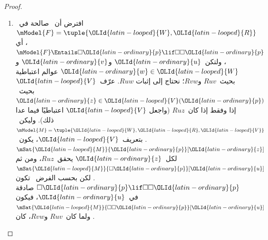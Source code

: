 \documentclass[../../../include/open-logic-section]{subfiles}
\begin{document}
\begin{proof}
\begin{enumerate}
    وُجد~$\OLId{latin-ordinary}{u}$ و$\OLId{latin-ordinary}{v} \in \OLId{latin-looped}{W}$ بحيث~$Ruv$ لكن ليس~$Rvu$. عرّف~$\OLId{latin-looped}{V}$ بحيث
    $\OLId{latin-ordinary}{w} \in \OLId{latin-looped}{V}(\OLId{latin-ordinary}{p})$ إذا وفقط إذا لم يكن~$Rvw$ (واجعل~$\OLId{latin-looped}{V}$ اعتباطيًا فيما
    عدا ذلك). وليكن~$\mModel{M} =\tuple{\OLId{latin-looped}{W}, \OLId{latin-looped}{R}, \OLId{latin-looped}{V}}$. الآن، بتعريف~$\OLId{latin-looped}{V}$،
    يكون~$\mSat{\OLId{latin-looped}{M}}{\OLId{latin-ordinary}{p}}[\OLId{latin-ordinary}{w}]$ لكل~$\OLId{latin-ordinary}{w}$ لا يحقق~$Rvw$، وبخاصة
    $\mSat{\OLId{latin-looped}{M}}{\OLId{latin-ordinary}{p}}[\OLId{latin-ordinary}{u}]$ لأن~$Rvu$ لا يصدق. كذلك، لما كان~$Rvw$ إذا وفقط
    إذا كان~$\OLId{latin-ordinary}{w} \notin \OLId{latin-looped}{V}(\OLId{latin-ordinary}{p})$، فلا يوجد~$\OLId{latin-ordinary}{w}$ يحقق~$Rvw$ و
    $\mSat{\OLId{latin-looped}{M}}{\OLId{latin-ordinary}{p}}[\OLId{latin-ordinary}{w}]$ معًا، ومن ثم~$\mSat/{\OLId{latin-looped}{M}}{\Diamond \OLId{latin-ordinary}{p}}[\OLId{latin-ordinary}{v}]$. ولما
    كان~$Ruv$، كان أيضًا~$\mSat/{\OLId{latin-looped}{M}}{\Box\Diamond \OLId{latin-ordinary}{p}}[\OLId{latin-ordinary}{u}]$. فيلزم
    $\mSat/{\OLId{latin-looped}{M}}{\OLId{latin-ordinary}{p} \lif \Box\Diamond \OLId{latin-ordinary}{p}}[\OLId{latin-ordinary}{u}]$، ومن ثم لا تكون~
    صالحة في~$\mModel{F}$.
  \item افترض أن~ صالحة في~$\mModel{F} = \tuple{\OLId{latin-looped}{W},\OLId{latin-looped}{R}}$، أي
    $\mModel{F} \Entails \Box \OLId{latin-ordinary}{p} \lif \Box\Box \OLId{latin-ordinary}{p}$، ولتكن~$\OLId{latin-ordinary}{u}$ و$\OLId{latin-ordinary}{v}$
    و$\OLId{latin-ordinary}{w} \in \OLId{latin-looped}{W}$ عوالم اعتباطية بحيث~$Ruv$ و$Rvw$؛ نحتاج إلى إثبات
    $Ruw$. عرّف~$\OLId{latin-looped}{V}$ بحيث~$\OLId{latin-ordinary}{z} \in \OLId{latin-looped}{V}(\OLId{latin-ordinary}{p})$ إذا وفقط إذا كان~$Ruz$ (واجعل
    $\OLId{latin-looped}{V}$ اعتباطيًا فيما عدا ذلك). وليكن~$\mModel{M} =\tuple{\OLId{latin-looped}{W}, \OLId{latin-looped}{R}, \OLId{latin-looped}{V}}$.
    بتعريف~$\OLId{latin-looped}{V}$، يكون~$\mSat{\OLId{latin-looped}{M}}{\OLId{latin-ordinary}{p}}[\OLId{latin-ordinary}{z}]$ لكل~$\OLId{latin-ordinary}{z}$ يحقق~$Ruz$، ومن ثم
    $\mSat{\OLId{latin-looped}{M}}{\Box \OLId{latin-ordinary}{p}}[\OLId{latin-ordinary}{u}]$. لكن بحسب الفرض~ تكون
    $\Box \OLId{latin-ordinary}{p} \lif \Box \Box \OLId{latin-ordinary}{p}$ صادقة في~$\OLId{latin-ordinary}{u}$، فيكون
    $\mSat{\OLId{latin-looped}{M}}{\Box \Box \OLId{latin-ordinary}{p}}[\OLId{latin-ordinary}{u}]$. ولما كان~$Ruv$ و$Rvw$، كان

\end{enumerate}
\end{proof}
\end{document}
